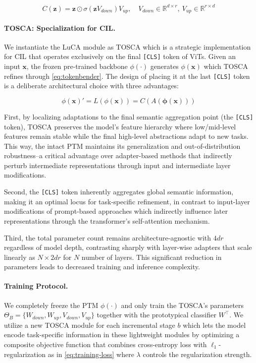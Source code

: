 \begin{equation}
    C(\mathbf{z}) = \mathbf{z} \odot \sigma(\mathbf{z}V_{down})V_{up}, \quad V_{down} \in \mathbb{R}^{d \times r}, \ V_{up} \in \mathbb{R}^{r \times d}
    \label{eq:calibrator}
\end{equation}

\paragraph{TOSCA: Specialization for CIL.} We instantiate the LuCA module as TOSCA which is a strategic implementation for CIL that operates exclusively on the final \texttt{[CLS]} token of ViTs. Given an input $\mathbf{x}$, the frozen pre-trained backbone $\phi(\cdot)$ generates $\phi(\mathbf{x})$ which TOSCA refines through \cref{eq:tokenbender}. The design of placing it at the last \texttt{[CLS]} token is a deliberate architectural choice with three advantages:

\begin{equation}
    \phi(\mathbf{x})' = L(\phi(\mathbf{x})) = C(A(\mathbf{\phi(\mathbf{x})}))
    \label{eq:tokenbender}
\end{equation}

First, by localizing adaptations to the final semantic aggregation point (the \texttt{[CLS]} token), TOSCA preserves the model's feature hierarchy where low/mid-level features remain stable while the final high-level abstractions adapt to new tasks. This way, the intact PTM maintains its generalization and out-of-distribution robustness--a critical advantage over adapter-based methods that indirectly perturb intermediate representations through input and intermediate layer modifications. 

Second, the \texttt{[CLS]} token inherently aggregates global semantic information, making it an optimal locus for task-specific refinement, in contrast to input-layer modifications of prompt-based approaches which indirectly influence later representations through the transformer’s self-attention mechanism.

Third, the total parameter count remains architecture-agnostic with $4dr$ regardless of model depth, contrasting sharply with layer-wise adapters that scale linearly as $N \times 2dr$ for $N$ number of layers. This significant reduction in parameters leads to decreased training and inference complexity.


\paragraph{Training Protocol.}  
We completely freeze the PTM $\phi(\cdot)$ and only train the TOSCA's parameters $\Theta_{B} = \{W_{down}, W_{up}, V_{down}, V_{up}\}$ together with the prototypical classifier $W^\top$.
We utilize a new TOSCA module for each incremental stage $b$ which lets the model encode task-specific information in these lightweight modules by optimizing a composite objective function that combines cross-entropy loss with $\ell_1$-regularization as in \cref{eq:training-loss} where $\lambda$ controls the regularization strength.

